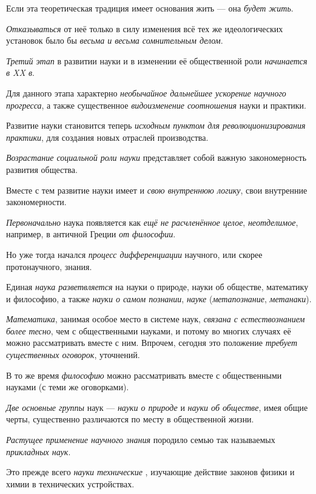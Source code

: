 \documentclass[a4paper,14pt,russian]{extreport}
\begin{document}
Если эта теоретическая традиция имеет основания жить --- она \emph{будет жить}.

\emph{Отказываться} от неё только в силу изменения всё тех же идеологических установок было бы \emph{весьма и весьма сомнительным делом}.

\emph{Третий этап} в развитии науки и в изменении её общественной роли \emph{начинается в XX в}.

Для данного этапа характерно \emph{необычайное дальнейшее ускорение научного прогресса}, а также существенное \emph{видоизменение соотношения} науки и практики.

Развитие науки становится теперь \emph{исходным пунктом для революционизирования практики}, для создания новых отраслей производства.

\emph{Возрастание социальной роли науки} представляет собой важную закономерность развития общества.

Вместе с тем развитие науки имеет и \emph{свою внутреннюю логику}, свои внутренние закономерности.

\emph{Первоначально} наука появляется как \emph{ещё не расчленённое целое}, \emph{неотделимое}, например, в античной Греции \emph{от философии}.

Но уже тогда начался \emph{процесс дифференциации} научного, или скорее протонаучного, знания.

Единая \emph{наука разветвляется} на науки о природе, науки об обществе, математику и философию, а также \emph{науки о самом познании}, \emph{науке} (\emph{метапознание}, \emph{метанаки}).

\emph{Математика}, занимая особое место в системе наук, \emph{связана с естествознанием более тесно}, чем с общественными науками, и потому во многих случаях её можно рассматривать вместе с ним. Впрочем, сегодня это положение \emph{требует существенных оговорок}, уточнений.

В то же время \emph{философию} можно рассматривать вместе с общественными науками (с теми же оговорками).

\emph{Две основные группы} наук --- \emph{науки о природе} и \emph{науки об обществе}, имея общие черты, существенно различаются по месту в общественной жизни.

\emph{Растущее применение научного знания} породило семью так называемых \emph{прикладных наук}.

Это прежде всего \emph{науки технические} , изучающие действие законов физики и химии в технических устройствах.
\end{document}
